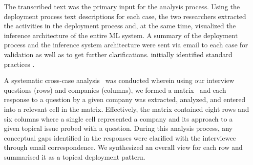 \DIFaddend The transcribed text was the primary input for the analysis process. Using the deployment process text descriptions for each case, the two researchers extracted the activities in the deployment process and, at the same time, visualized the inference architecture of the entire ML system. A summary of the deployment process and the inference system architecture were sent via email to each case for validation as well as to get further clarifications. \DIFdelbegin {}\DIFdelend \DIFaddbegin {}\DIFaddend initially identified standard practices \DIFdelbegin {}\DIFdelend \DIFaddbegin {}\DIFaddend . 

A systematic cross-case analysis~\cite{seaman1999qualitative} was conducted wherein using our interview questions (rows) and companies (columns), we formed a matrix~\cite{webster2002analyzing} and each response to a question by a given company was extracted, analyzed, and entered into a relevant cell in the matrix. Effectively, the matrix contained eight rows and six columns where a single cell represented a company and its approach to a given topical issue probed with a question. During this analysis process, any conceptual gaps identified in the responses were clarified with the interviewee through email correspondence. We synthesized an overall view for each row and summarised it as a topical deployment pattern.



\DIFdelbegin %
{%
}
\DIFdelend %



